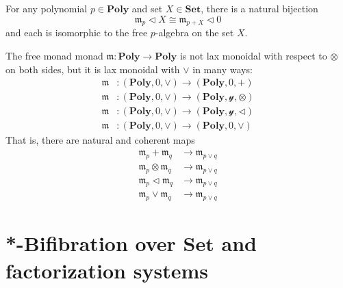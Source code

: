\documentclass[11pt, one side, article]{memoir}
\theoremstyle{definition}
\theoremstyle{plain}
\newcommand{\Cat}[1]{\mathbf{#1}}%
\newcommand{\smset}{\Cat{Set}}
\newcommand{\yon}{\mathcal{y}}
\newcommand{\poly}{\Cat{Poly}}
\newcommand{\0}{\textsf{0}}
\newcommand{\1}{\tn{\textsf{1}}}
\newcommand{\tri}{\mathbin{\triangleleft}}
\begin{document}
For any polynomial $p\in\poly$ and set $X\in\smset$, there is a natural bijection
\begin{equation}
  \mathfrak{m}_p\tri X
  \cong
	\mathfrak{m}_{p+X}\tri 0  
\end{equation}
and each is isomorphic to the free $p$-algebra on the set $X$.

The free monad monad $\mathfrak{m}\colon\poly\to\poly$ is not lax monoidal with respect to $\otimes$ on both sides, but it is lax monoidal with $\vee$ in many ways:
\begin{align}\label{eqn.vees}
	\mathfrak{m}&\colon(\poly,0,\vee)\to(\poly,0,+)\\
	\mathfrak{m}&\colon(\poly,0,\vee)\to(\poly,\yon,\otimes)\\
	\mathfrak{m}&\colon(\poly,0,\vee)\to(\poly,\yon,\tri)\\
	\mathfrak{m}&\colon(\poly,0,\vee)\to(\poly,0,\vee)
\end{align}
That is, there are natural and coherent maps
\begin{align}
	\mathfrak{m}_p+\mathfrak{m}_q&\to\mathfrak{m}_{p\vee q}\\
	\mathfrak{m}_p\otimes\mathfrak{m}_q&\to\mathfrak{m}_{p\vee q}\\
	\mathfrak{m}_p\tri\mathfrak{m}_q&\to\mathfrak{m}_{p\vee q}\\
	\mathfrak{m}_p\vee\mathfrak{m}_q&\to\mathfrak{m}_{p\vee q}
\end{align}



\chapter{*-Bifibration over $\smset$ and factorization systems}
\end{document}
